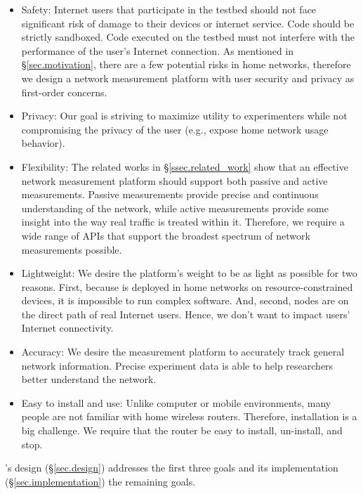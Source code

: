 \begin{itemize}
\item Safety: Internet users that participate in the testbed should not face significant risk
of damage to their devices or internet service. Code should be strictly sandboxed.
 Code executed on the testbed must not interfere with the performance of the user's
 Internet connection. As mentioned in \S{\ref{sec.motivation}}, there are a few
  potential risks in home networks, therefore we design a network measurement platform
   with user security and privacy as first-order concerns.

\item Privacy: Our goal is striving to maximize utility to experimenters while
not compromising the privacy of the user (e.g., expose home network usage behavior).

\item Flexibility: The related works in \S{\ref{ssec.related_work}} show that an
effective network measurement platform should support both passive and active measurements.
Passive measurements provide precise and continuous understanding of the network, while
 active measurements provide some insight into the way real traffic is treated within it.
Therefore, we require a wide range of APIs that support the broadest spectrum of
network measurements possible.

\item Lightweight: We desire the platform's weight to be as light as possible for two reasons.
First, because \sysname is deployed in home networks on resource-constrained
devices, it is impossible to run complex software. And, second, \sysname nodes
 are on the direct path of real Internet users. Hence, we don't want to impact users' Internet connectivity.

\item Accuracy: We desire the measurement platform to accurately track
general network information. Precise experiment data is able to help researchers
 better understand the network.

\item Easy to install and use: Unlike computer or mobile environments, many people are
not familiar with home wireless routers. Therefore, installation is a big challenge.
 We require that the router be easy to install, un-install, and stop.
\end{itemize}

\sysname's design (\S\ref{sec.design}) addresses the first three goals and
its implementation (\S\ref{sec.implementation}) the remaining goals.
